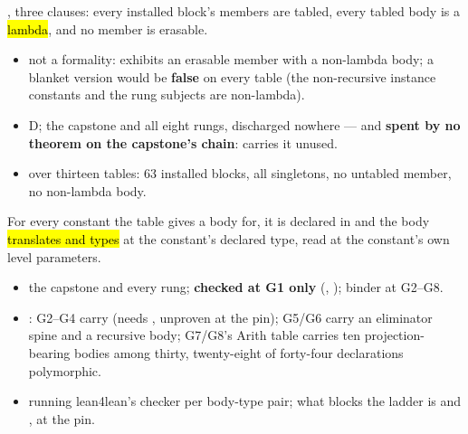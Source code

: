 \begin{assumption}
\label{asm:hblk}
\stAssumed{}  , three clauses: every installed
block's members are tabled, every tabled body is a \hl{lambda}, and no member is erasable.
\begin{itemize}
\item {} not a formality:  exhibits an erasable
member with a non-lambda body; a blanket version would be \textbf{false} on every table (the
non-recursive instance constants and the rung subjects are non-lambda).
\item {} D;  the capstone and all eight rungs, discharged nowhere ---
and \textbf{spent by no theorem on the capstone's chain}: 
carries it unused.
\item {} over thirteen tables: 63 installed blocks, all singletons, no untabled
member, no non-lambda body.
\end{itemize}
\end{assumption}

\begin{assumption}
\label{asm:hcb}
\stAssumed{}  For every constant the table gives a body for, it is declared in
 and the body \hl{translates and types} at the constant's declared type, read at the
constant's own level parameters.
\begin{itemize}
\item {} the capstone and every rung; \textbf{checked at G1 only}
(, \stChecked{}); binder at G2--G8.
\item {}: G2--G4 carry  (needs ,
unproven at the pin); G5/G6 carry an eliminator spine and a recursive body; G7/G8's Arith table
carries ten projection-bearing bodies among thirty, twenty-eight of forty-four declarations
polymorphic.
\item {} running lean4lean's checker per body-type pair; what blocks
the ladder is  and ,  at the pin.
\end{itemize}
\end{assumption}

